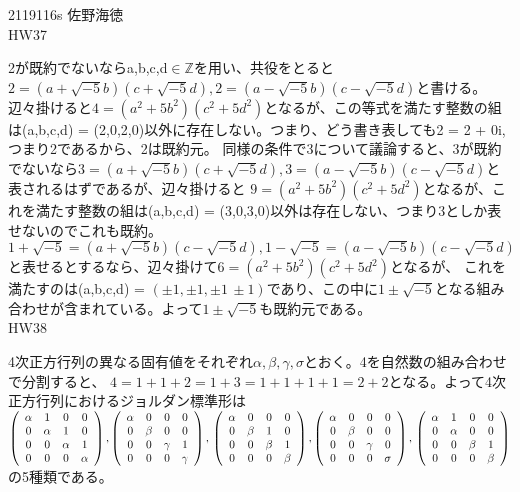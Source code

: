 \documentclass[11pt]{article}
\begin{document}
2119116s 佐野海徳\\
HW37
\par 2が既約でないならa,b,c,d$\in \mathbb{Z}$を用い、共役をとると$2 = (a + \sqrt{-5}b)(c + \sqrt{-5}d),2 = (a - \sqrt{-5}b)(c - \sqrt{-5}d)$と書ける。
辺々掛けると$4 = (a^2 + 5b^2)(c^2 + 5d^2)$となるが、この等式を満たす整数の組は(a,b,c,d) = (2,0,2,0)以外に存在しない。つまり、どう書き表しても2 = 2 + 0i,つまり2であるから、2は既約元。
同様の条件で3について議論すると、3が既約でないなら$3 = (a + \sqrt{-5}b)(c + \sqrt{-5}d),3 = (a - \sqrt{-5}b)(c - \sqrt{-5}d)$と表されるはずであるが、辺々掛けると
$9 = (a^2 + 5b^2)(c^2 + 5d^2)$となるが、これを満たす整数の組は(a,b,c,d) = (3,0,3,0)以外は存在しない、つまり3としか表せないのでこれも既約。
$1 + \sqrt{-5} = (a + \sqrt{-5}b)(c - \sqrt{-5}d), 1 - \sqrt{-5} = (a - \sqrt{-5}b)(c - \sqrt{-5}d)$と表せるとするなら、辺々掛けて$6 = (a^2 + 5b^2)(c^2 + 5d^2)$となるが、
これを満たすのは(a,b,c,d) = $(\pm1,\pm1,\pm1\,\pm1)$であり、この中に$1 \pm \sqrt{-5}$となる組み合わせが含まれている。よって$1\pm \sqrt{-5}$も既約元である。\\
HW38
\par 4次正方行列の異なる固有値をそれぞれ$\alpha,\beta,\gamma,\sigma$とおく。4を自然数の組み合わせで分割すると、
$4 = 1 + 1 + 2 = 1 + 3 = 1 + 1 + 1 + 1 = 2 + 2$となる。よって4次正方行列におけるジョルダン標準形は\\
$\left(
\begin{array}{cccc}
    \alpha & 1 & 0 & 0 \\
    0 & \alpha & 1 & 0 \\
    0 & 0 & \alpha & 1 \\
    0 & 0 & 0 & \alpha
\end{array}
\right),
\left(
\begin{array}{cccc}
    \alpha & 0 & 0 & 0 \\
    0 & \beta & 0 & 0 \\
    0 & 0 & \gamma & 1 \\
    0 & 0 & 0 & \gamma
\end{array}
\right),\\
\left(
\begin{array}{cccc}
    \alpha & 0 & 0 & 0 \\
    0 & \beta & 1 & 0 \\
    0 & 0 & \beta & 1 \\
    0 & 0 & 0 & \beta
\end{array}
\right),
\left(
\begin{array}{cccc}
    \alpha & 0 & 0 & 0 \\
    0 & \beta & 0 & 0 \\
    0 & 0 & \gamma & 0 \\
    0 & 0 & 0 & \sigma
\end{array}
\right),\\
\left(
\begin{array}{cccc}
    \alpha & 1 & 0 & 0 \\
    0 & \alpha & 0 & 0 \\
    0 & 0 & \beta & 1 \\
    0 & 0 & 0 & \beta
\end{array}
\right)
$の5種類である。
\end{document}
